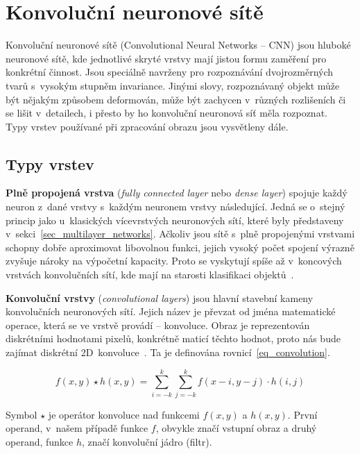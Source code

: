 \section{Konvoluční neuronové sítě}
\label{sec_conv_networks}

Konvoluční neuronové sítě (Convolutional Neural Networks -- CNN) jsou hluboké neuronové sítě, kde jednotlivé skryté vrstvy mají jistou formu zaměření pro konkrétní činnost. Jsou speciálně navrženy pro rozpoznávání dvojrozměrných tvarů s~vysokým stupněm invariance. Jinými slovy, rozpoznávaný objekt může být nějakým způsobem deformován, může být zachycen v~různých rozlišeních či se lišit v~detailech, i přesto by ho konvoluční neuronová síť měla rozpoznat.~\cite{haykinNeuralNetworks} Typy vrstev používané při zpracování obrazu jsou vysvětleny dále.


\subsection*{Typy vrstev}

\textbf{Plně propojená vrstva} (\textit{fully connected layer} nebo \textit{dense layer}) spojuje každý neuron z~dané vrstvy s~každým neuronem vrstvy následující. Jedná se o~stejný princip jako u~klasických vícevrstvých neuronových sítí, které byly představeny v~sekci~\ref{sec_multilayer_networks}. Ačkoliv jsou sítě s~plně propojenými vrstvami schopny dobře aproximovat libovolnou funkci, jejich vysoký počet spojení výrazně zvyšuje nároky na výpočetní kapacity. Proto se vyskytují spíše až v~koncových vrstvách konvolučních sítí, kde mají na starosti klasifikaci objektů~\cite{bookElementsNeuralNets}.


\textbf{Konvoluční vrstvy} (\textit{convolutional layers}) jsou hlavní stavební kameny konvolučních neuronových sítí. Jejich název je převzat od jména matematické operace, která se ve vrstvě provádí -- konvoluce. Obraz je reprezentován diskrétními hodnotami pixelů, konkrétně maticí těchto hodnot, proto nás bude zajímat diskrétní 2D~konvoluce~\cite{paperLecunNature}. Ta je definována rovnicí~\ref{eq_convolution}.

\begin{equation}
    f(x,y) \star h(x,y)=\sum_{i=-k}^{k}\sum_{j=-k}^{k}f(x-i,y-j)\cdot h(i,j)
    \label{eq_convolution}
\end{equation}

Symbol $\star$ je operátor konvoluce nad funkcemi $f(x,y)$ a $h(x,y)$. První operand, v~našem případě funkce $f$, obvykle značí vstupní obraz a druhý operand, funkce $h$, značí konvoluční jádro (filtr).

